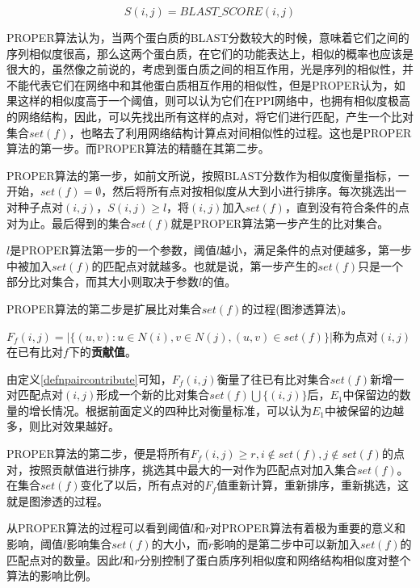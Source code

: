 \begin{equation}\label{proper1}
S(i,j)=BLAST\_SCORE(i,j)
\end{equation}

PROPER算法认为，当两个蛋白质的BLAST分数较大的时候，意味着它们之间的序列相似度很高，那么这两个蛋白质，在它们的功能表达上，相似的概率也应该是很大的，虽然像之前说的，考虑到蛋白质之间的相互作用，光是序列的相似性，并不能代表它们在网络中和其他蛋白质相互作用的相似性，但是PROPER认为，如果这样的相似度高于一个阈值，则可以认为它们在PPI网络中，也拥有相似度极高的网络结构，因此，可以先找出所有这样的点对，将它们进行匹配，产生一个比对集合$set(f)$，也略去了利用网络结构计算点对间相似性的过程。这也是PROPER算法的第一步。而PROPER算法的精髓在其第二步。

PROPER算法的第一步，如前文所说，按照BLAST分数作为相似度衡量指标，一开始，$set(f)=\emptyset$，然后将所有点对按相似度从大到小进行排序。每次挑选出一对种子点对$(i,j)，S(i,j)\geq l$，将$(i,j)$加入$set(f)$，直到没有符合条件的点对为止。最后得到的集合$set(f)$就是PROPER算法第一步产生的比对集合。

$l$是PROPER算法第一步的一个参数，阈值$l$越小，满足条件的点对便越多，第一步中被加入$set(f)$的匹配点对就越多。也就是说，第一步产生的$set(f)$只是一个部分比对集合，而其大小则取决于参数$l$的值。

PROPER算法的第二步是扩展比对集合$set(f)$的过程(图渗透算法)。

\begin{defn}[点对贡献值]
\label{defnpaircontribute}
$F_f(i,j)=\left | \{(u,v):u\in N(i),v\in N(j),(u,v)\in set(f)\} \right |$称为点对$(i,j)$在已有比对$f$下的\textbf{贡献值}。
\end{defn}

由定义\ref{defnpaircontribute}可知，$F_f(i,j)$衡量了往已有比对集合$set(f)$新增一对匹配点对$(i,j)$形成一个新的比对集合$set(f)\bigcup \{(i,j)\}$后，$E_1$中保留边的数量的增长情况。根据前面定义的四种比对衡量标准，可以认为$E_1$中被保留的边越多，则比对效果越好。

PROPER算法的第二步，便是将所有$F_f(i,j)\geq r,i\notin set(f),j\notin set(f)$的点对，按照贡献值进行排序，挑选其中最大的一对作为匹配点对加入集合$set(f)$。在集合$set(f)$变化了以后，所有点对的$F_f$值重新计算，重新排序，重新挑选，这就是图渗透的过程。

从PROPER算法的过程可以看到阈值$l$和$r$对PROPER算法有着极为重要的意义和影响，阈值$l$影响集合$set(f)$的大小，而$r$影响的是第二步中可以新加入$set(f)$的匹配点对的数量。因此$l$和$r$分别控制了蛋白质序列相似度和网络结构相似度对整个算法的影响比例。


